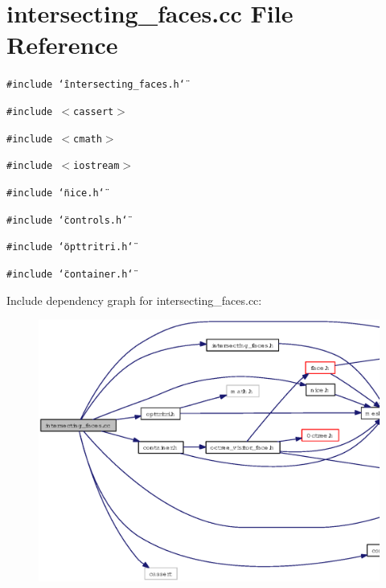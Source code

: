 \section{intersecting\_\-faces.cc File Reference}
\label{intersecting__faces_8cc}
{\tt \#include \char`\"{}intersecting\_\-faces.h\char`\"{}}\par
{\tt \#include $<$cassert$>$}\par
{\tt \#include $<$cmath$>$}\par
{\tt \#include $<$iostream$>$}\par
{\tt \#include \char`\"{}nice.h\char`\"{}}\par
{\tt \#include \char`\"{}controls.h\char`\"{}}\par
{\tt \#include \char`\"{}opttritri.h\char`\"{}}\par
{\tt \#include \char`\"{}container.h\char`\"{}}\par


Include dependency graph for intersecting\_\-faces.cc:\begin{figure}[H]
\begin{center}
\leavevmode
\includegraphics[width=390pt]{intersecting__faces_8cc__incl}
\end{center}
\end{figure}
